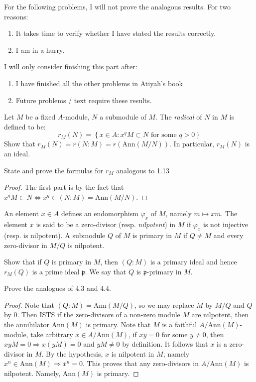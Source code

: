 \documentclass{solution}
\begin{document}
For the following problems, I will not prove the analogous results. For two reasons:
\begin{enumerate}
    \item It takes time to verify whether I have stated the results correctly.
    \item I am in a hurry.
\end{enumerate}
I will only consider finishing this part after:
\begin{enumerate}
    \item I have finished all the other problems in Atiyah's book
    \item Future problems / text require these results.
\end{enumerate}

\begin{problem}
    Let $M$ be a fixed $A$-module, $N$ a submodule of $M$. The \textit{radical} of $N$ in $M$ is defined to be:
    $$r_{M}(N) = \left\lbrace x \in A: x^q M \subset N \text{ for some } q \gt 0 \right\rbrace$$
    Show that $r_M(N) = r(N : M) = r(\mathrm{Ann}(M / N))$. In particular, $r_M(N)$ is an ideal.

    State and prove the formulas for $r_M$ analogous to 1.13
\end{problem}

\begin{proof}
    The first part is by the fact that $x^q M \subset N \Leftrightarrow x^q \in (N : M) = \mathrm{Ann}(M / N)$.
\end{proof}

\begin{problem}
    An element $x \in A$ defines an endomorphism $\varphi_x$ of $M$, namely $m \mapsto xm$. The element $x$ is said to be a zero-divisor (resp. \textit{nilpotent}) in $M$ if $\varphi_x$ is not injective (resp. is nilpotent). A submodule $Q$ of $M$ is primary in $M$ if $Q \ne M$ and every zero-divisor in $M / Q$ is nilpotent.

    Show that if $Q$ is primary in $M$, then $(Q: M)$ is a primary ideal and hence $r_M(Q)$ is a prime ideal $\mathfrak{p}$. We say that $Q$ is $\mathfrak{p}$-primary in $M$.

    Prove the analogues of 4.3 and 4.4.
\end{problem}

\begin{proof}
    Note that $(Q : M) = \mathrm{Ann}(M / Q)$, so we may replace $M$ by $M / Q$ and $Q$ by $0$. Then ISTS if the zero-divisors of a non-zero module $M$ are nilpotent, then the annihilator $\mathrm{Ann}(M)$ is primary. Note that $M$ is a faithful $A / \mathrm{Ann}(M)$-module, take arbitrary $\overline{x} \in A / \mathrm{Ann}(M)$, if $\overline{xy} = 0$ for some $\overline{y} \ne 0$, then $xy M = 0 \Rightarrow x (yM) = 0$ and $yM \ne 0$ by definition. It follows that $x$ is a zero-divisor in $M$. By the hypothesis, $x$ is nilpotent in $M$, namely $x^n \in \mathrm{Ann}(M) \Rightarrow \overline{x}^n = 0$. This proves that any zero-divisors in $A / \mathrm{Ann}(M)$ is nilpotent. Namely, $\mathrm{Ann}(M)$ is primary.
\end{proof}
\end{document}
